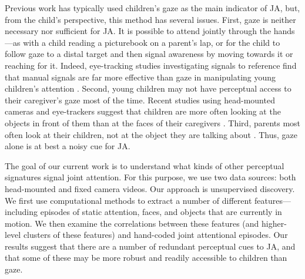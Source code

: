 \documentclass[10pt,letterpaper]{article}
\begin{document}
Previous work has typically used children's gaze as the main indicator of JA, but, from the child's perspective, this method has several issues. First, gaze is neither necessary nor sufficient for JA. It is possible to attend jointly through the hands---as with a child reading a picturebook on a parent's lap, or for the child to follow gaze to a distal target and then signal awareness by moving towards it or reaching for it. Indeed, eye-tracking studies investigating signals to reference find that manual signals are far more effective than gaze in manipulating young children's attention \cite{yurovsky2013}. Second, young children may not have perceptual access to their caregiver's gaze most of the time. Recent studies using head-mounted cameras and eye-trackers suggest that children are more often looking at the objects in front of them than at the faces of their caregivers \cite{smith2011,franchak2011,frank2013}. Third, parents most often look at their children, not at the object they are talking about \cite{frank2013b}. Thus, gaze alone is at best a noisy cue for JA.

The goal of our current work is to understand what kinds of other perceptual signatures signal joint attention. For this purpose, we use two data sources: both head-mounted and fixed camera videos. Our approach is unsupervised discovery. We first use computational methods to extract a number of different features---including episodes of static attention, faces, and objects that are currently in motion. We then  examine the correlations between these features (and higher-level clusters of these features) and hand-coded joint attentional episodes. Our results suggest that there are a number of redundant perceptual cues to JA, and that some of these may be more robust and readily accessible to children than gaze.

\end{document}
